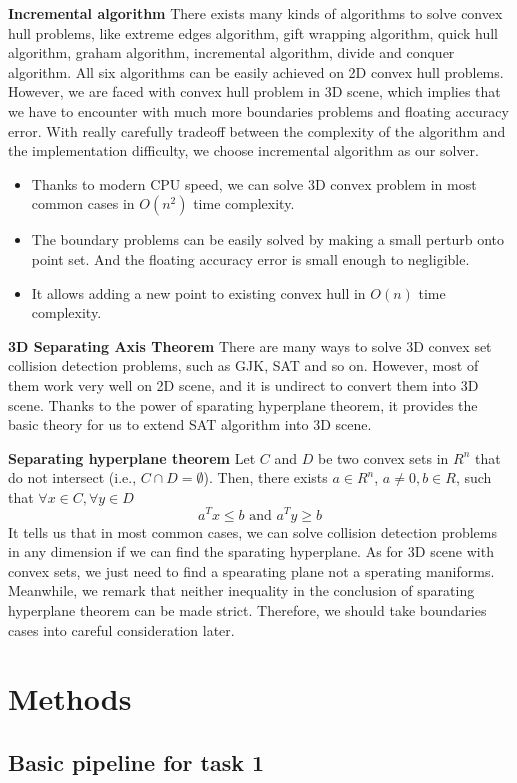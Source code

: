 \documentclass[acmtog]{acmart}
\begin{document}
\textbf{Incremental algorithm} There exists many kinds of algorithms to solve convex hull problems, like extreme edges algorithm, gift wrapping algorithm, quick hull algorithm, graham algorithm, incremental algorithm, divide and conquer algorithm. All six algorithms can be easily achieved on 2D convex hull problems. However, we are faced with convex hull problem in 3D scene, which implies that we have to encounter with much more boundaries problems and floating accuracy error. With really carefully tradeoff between the complexity of the algorithm and the implementation difficulty, we choose incremental algorithm as our solver.

\begin{itemize}
	\item Thanks to modern CPU speed, we can solve 3D convex problem in most common cases in $O(n^2)$ time complexity.
	\item The boundary problems can be easily solved by making a small perturb onto point set. And the floating accuracy error is small enough to negligible.
	\item It allows adding a new point to existing convex hull in $O(n)$ time complexity.
\end{itemize}

\textbf{3D Separating Axis Theorem} There are many ways to solve 3D convex set collision detection problems, such as GJK, SAT and so on. However, most of them work very well on 2D scene, and it is undirect to convert them into 3D scene. Thanks to the power of sparating hyperplane theorem, it provides the basic theory for us to extend SAT algorithm into 3D scene.

\textbf{Separating hyperplane theorem} Let $C$ and $D$ be two convex sets in $R^n$ that do not intersect (i.e., $C\cap D=\emptyset$). Then, there exists $a\in R^n$, $a\not=0, b\in R$, such that $\forall x\in C,\forall y\in D$
$$
a^Tx\le b \text{ and } a^Ty\ge b
$$
	\quad It tells us that in most common cases, we can solve collision detection problems in any dimension if we can find the sparating hyperplane. As for 3D scene with convex sets, we just need to find a spearating plane not a sperating maniforms. Meanwhile, we remark that neither inequality in the conclusion of sparating hyperplane theorem can be made strict. Therefore, we should take boundaries cases into careful consideration later.
\section{Methods}
\subsection{Basic pipeline for task 1}
\end{document}
